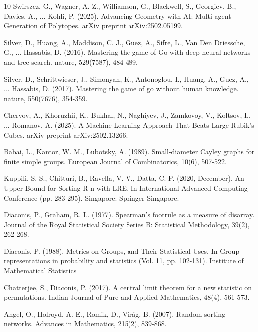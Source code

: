 \documentclass[reqno,11pt]{amsart}
\begin{document}
\begin{thebibliography}{10}
Swirszcz, G., Wagner, A. Z., Williamson, G., Blackwell, S., Georgiev, B., Davies, A., ... Kohli, P. (2025). Advancing Geometry with AI: Multi-agent Generation of Polytopes. arXiv preprint arXiv:2502.05199.

Silver, D., Huang, A., Maddison, C. J., Guez, A., Sifre, L., Van Den Driessche, G., ...  Hassabis, D. (2016). Mastering the game of Go with deep neural networks and tree search. nature, 529(7587), 484-489.

Silver, D., Schrittwieser, J., Simonyan, K., Antonoglou, I., Huang, A., Guez, A., ... Hassabis, D. (2017). Mastering the game of go without human knowledge. nature, 550(7676), 354-359.

Chervov, A., Khoruzhii, K., Bukhal, N., Naghiyev, J., Zamkovoy, V., Koltsov, I., ...  Romanov, A. (2025). A Machine Learning Approach That Beats Large Rubik's Cubes. arXiv preprint arXiv:2502.13266.

Babai, L., Kantor, W. M.,  Lubotsky, A. (1989). Small-diameter Cayley graphs for finite simple groups. European Journal of Combinatorics, 10(6), 507-522.

Kuppili, S. S., Chitturi, B., Ravella, V. V.,  Datta, C. P. (2020, December). An Upper Bound for Sorting R n with LRE. In International Advanced Computing Conference (pp. 283-295). Singapore: Springer Singapore.

Diaconis, P., Graham, R. L. (1977). Spearman's footrule as a measure of disarray. Journal of the Royal Statistical Society Series B: Statistical Methodology, 39(2), 262-268.

Diaconis, P. (1988). Metrics on Groups, and Their Statistical Uses. In Group representations in probability and statistics (Vol. 11, pp. 102-131). Institute of Mathematical Statistics

Chatterjee, S.,  Diaconis, P. (2017). A central limit theorem for a new statistic on permutations. Indian Journal of Pure and Applied Mathematics, 48(4), 561-573.

Angel, O., Holroyd, A. E., Romik, D.,  Virág, B. (2007). Random sorting networks. Advances in Mathematics, 215(2), 839-868.


\end{thebibliography}
\end{document}
